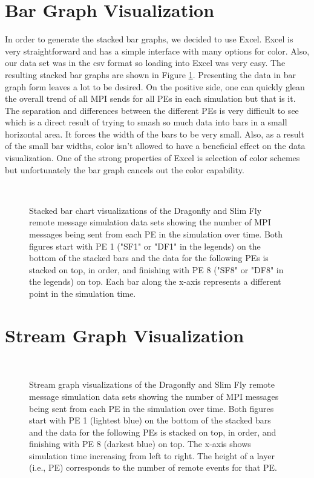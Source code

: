 \documentclass[12pt]{article}
\begin{document}
\section{Bar Graph Visualization} \label{bar}
In order to generate the stacked bar graphs, we decided to use Excel. Excel is very straightforward and has a simple interface with many options for color. Also, our data set was in the csv format so loading into Excel was very easy. The resulting stacked bar graphs are shown in Figure \ref{Bar}. Presenting the data in bar graph form leaves a lot to be desired. On the positive side, one can quickly glean the overall trend of all MPI sends for all PEs in each simulation but that is it. The separation and differences between the different PEs is very difficult to see which is a direct result of trying to smash so much data into bars in a small horizontal area. It forces the width of the bars to be very small. Also, as a result of the small bar widths, color isn't allowed to have a beneficial effect on the data visualization. One of the strong properties of Excel is selection of color schemes but unfortunately the bar graph cancels out the color capability.
\begin{figure}[!ht]
     \centering
     \\
     \caption{Stacked bar chart visualizations of the Dragonfly and Slim Fly remote message simulation data sets showing the number of MPI messages being sent from each PE in the simulation over time. Both figures start with PE 1 ("SF1" or "DF1" in the legends) on the bottom of the stacked bars and the data for the following PEs is stacked on top, in order, and finishing with PE 8 ("SF8" or "DF8" in the legends) on top. Each bar along the x-axis represents a different point in the simulation time.}
     \label{Bar}
\end{figure}

\section{Stream Graph Visualization} \label{stream}

\begin{figure}[!ht]
     \centering
     \\
     \caption{Stream graph visualizations of the Dragonfly and Slim Fly remote message simulation data sets showing the number of MPI messages being sent from each PE in the simulation over time. Both figures start with PE 1 (lightest blue) on the bottom of the stacked bars and the data for the following PEs is stacked on top, in order, and finishing with PE 8 (darkest blue) on top. The x-axis shows simulation time increasing from left to right.  The height of a layer (i.e., PE) corresponds to the number of remote events for that PE.  }
     \label{sg}
\end{figure}
\end{document}
